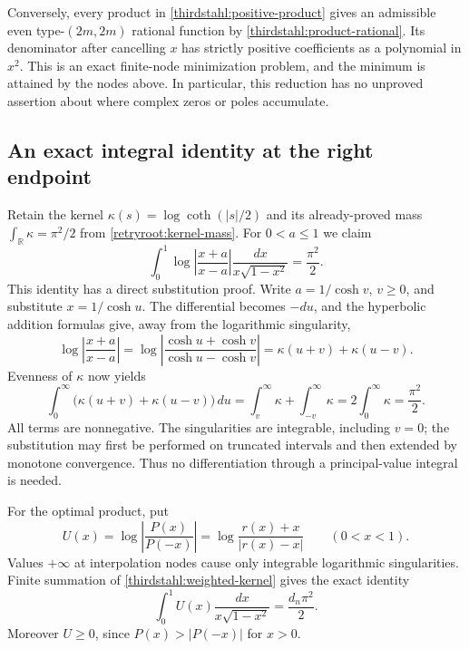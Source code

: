 \documentclass[11pt]{article}
\newcommand{\R}{\mathbb R}
\theoremstyle{remark}
\numberwithin{equation}{section}
\begin{document}
Conversely, every product in \eqref{thirdstahl:positive-product}
gives an admissible even type-$(2m,2m)$ rational function by
\eqref{thirdstahl:product-rational}.  Its denominator after cancelling
$x$ has strictly positive coefficients as a polynomial in $x^2$.
This is an exact finite-node minimization problem, and the minimum is
attained by the nodes above.  In particular, this reduction has no
unproved assertion about where complex zeros or poles accumulate.

\subsection{An exact integral identity at the right endpoint}
Retain the kernel $\kappa(s)=\log\coth(|s|/2)$ and its already-proved
mass $\int_{\R}\kappa=\pi^2/2$ from
\eqref{retryroot:kernel-mass}.  For $0<a\le1$ we claim
\begin{equation}\label{thirdstahl:weighted-kernel}
 \int_0^1
   \log\left|\frac{x+a}{x-a}\right|
   \frac{dx}{x\sqrt{1-x^2}}=\frac{\pi^2}{2}.
\end{equation}
This identity has a direct substitution proof.  Write
$a=1/\cosh v$, $v\ge0$, and substitute $x=1/\cosh u$.
The differential becomes $-du$, and the hyperbolic addition formulas
give, away from the logarithmic singularity,
\[
 \log\left|\frac{x+a}{x-a}\right|
 =\log\left|\frac{\cosh u+\cosh v}{\cosh u-\cosh v}\right|
 =\kappa(u+v)+\kappa(u-v).
\]
Evenness of $\kappa$ now yields
\[
 \int_0^\infty\bigl(\kappa(u+v)+\kappa(u-v)\bigr)\,du
 =\int_v^\infty\kappa+\int_{-v}^\infty\kappa
 =2\int_0^\infty\kappa=\frac{\pi^2}{2}.
\]
All terms are nonnegative.  The singularities are integrable, including
$v=0$; the substitution may first be performed on truncated intervals
and then extended by monotone convergence.  Thus no differentiation
through a principal-value integral is needed.

For the optimal product, put
\[
 U(x)=\log\left|\frac{P(x)}{P(-x)}\right|
     =\log\frac{r(x)+x}{|r(x)-x|}\qquad(0<x<1).
\]
Values $+\infty$ at interpolation nodes cause only integrable
logarithmic singularities.  Finite summation of
\eqref{thirdstahl:weighted-kernel} gives the exact identity
\begin{equation}\label{thirdstahl:mass-identity}
 \int_0^1 U(x)\frac{dx}{x\sqrt{1-x^2}}
 =\frac{d_n\pi^2}{2}.
\end{equation}
Moreover $U\ge0$, since $P(x)>|P(-x)|$ for $x>0$.
\end{document}
